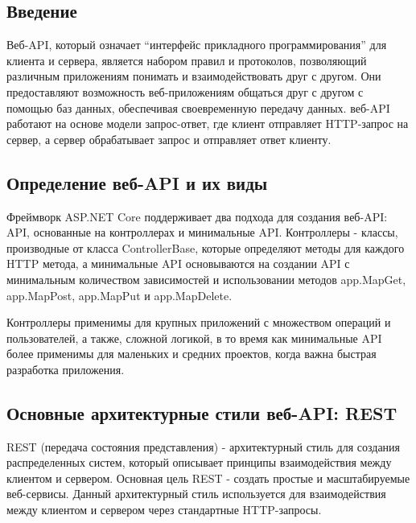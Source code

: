 \documentclass[a4paper,12pt]{report}
\begin{document}
\subsection{Введение}

Веб-\acs{API}, который означает “интерфейс прикладного программирования” для клиента и сервера, 
является набором правил и протоколов, позволяющий различным приложениям понимать и взаимодействовать 
друг с другом. Они предоставляют возможность веб-приложениям общаться друг с другом с помощью баз данных, 
обеспечивая своевременную передачу данных. веб-\acs{API} работают на основе модели запрос-ответ, где клиент 
отправляет \acs{HTTP}-запрос  на сервер, а сервер обрабатывает запрос и отправляет ответ клиенту.

\subsection{Определение веб-\acs{API} и их виды}

Фреймворк ASP.NET Core поддерживает два подхода для создания веб-\acs{API}: \acs{API}, основанные на контроллерах 
и минимальные \acs{API}. Контроллеры - классы, производные от класса ControllerBase, которые определяют методы 
для каждого \acs{HTTP} метода, а минимальные \acs{API} основываются на создании \acs{API} с минимальным количеством 
зависимостей и использовании методов app.MapGet, app.MapPost, app.MapPut и app.MapDelete. 

Контроллеры применимы для крупных приложений с множеством операций и пользователей, а также, сложной логикой, 
в то время как минимальные \acs{API} более применимы для маленьких и средних проектов, когда важна быстрая разработка приложения.

\subsection{Основные архитектурные стили веб-\acs{API}: \acs{REST}}

\ac{REST} (передача состояния представления) - архитектурный стиль для создания распределенных систем, который описывает принципы 
взаимодействия между клиентом и сервером. Основная цель \acs{REST} - создать простые и масштабируемые веб-сервисы. 
Данный архитектурный стиль используется для взаимодействия между клиентом и сервером через стандартные \acs{HTTP}-запросы.
\end{document}
